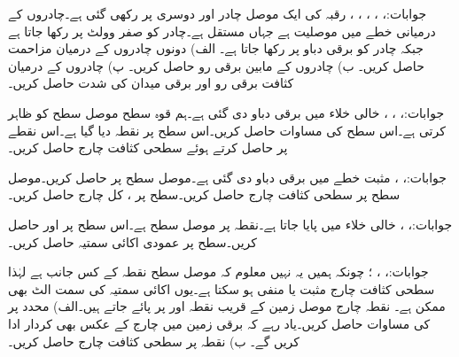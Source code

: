 جوابات:، ، ، ، ، 
رقبہ  کی ایک موصل چادر  اور دوسری  پر رکھی گئی ہے۔چادروں کے درمیانی خطے میں موصلیت  ہے جہاں  مستقل ہے۔چادر  کو صفر وولٹ پر رکھا جاتا ہے جبکہ چادر  کو  برقی دباو پر رکھا جاتا ہے۔ الف) دونوں چادروں کے درمیان مزاحمت حاصل کریں۔ ب) چادروں کے مابین برقی رو حاصل کریں۔ پ) چادروں کے درمیان کثافت برقی رو اور برقی میدان کی شدت حاصل کریں۔

جوابات:، ، ،
خالی خلاء میں برقی دباو  دی گئی ہے۔ہم قوہ سطح  موصل سطح کو ظاہر کرتی ہے۔اس سطح کی مساوات حاصل کریں۔اس سطح پر نقطہ  دیا گیا ہے۔اس نقطے پر  حاصل کرتے ہوئے سطحی کثافت چارج  حاصل کریں۔

جوابات:، ،
مثبت  خطے میں برقی دباو  دی گئی ہے۔موصل سطح  پر   حاصل کریں۔موصل سطح پر سطحی کثافت چارج حاصل کریں۔سطح پر ،  کل چارج حاصل کریں۔

جوابات:، ، 
خالی خلاء میں  پایا جاتا ہے۔نقطہ  پر موصل سطح ہے۔اس سطح پر  اور  حاصل کریں۔سطح پر عمودی اکائی سمتیہ  حاصل کریں۔

جوابات:، ،
 ؛ چونکہ ہمیں یہ نہیں معلوم کہ موصل سطح نقطہ   کے کس جانب ہے لہٰذا سطحی کثافت چارج مثبت یا منفی ہو سکتا ہے۔یوں اکائی سمتیہ کی سمت الٹ بھی ممکن ہے۔
نقطہ چارج  موصل زمین  کے قریب نقطہ  اور  پر پائے جاتے ہیں۔الف) محدد  پر  کی مساوات حاصل کریں۔یاد رہے کہ برقی زمین میں چارج کے عکس بھی کردار ادا کریں گے۔ ب) نقطہ  پر سطحی کثافت چارج حاصل کریں۔

